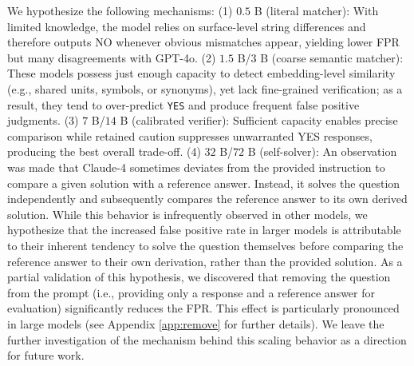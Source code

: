 We hypothesize the following mechanisms: (1) $0.5$ B (literal matcher): With limited knowledge, the model relies on surface-level string differences and therefore outputs NO whenever obvious mismatches appear, yielding lower FPR but many disagreements with GPT-4o.
(2) $1.5$ B/$3$ B (coarse semantic matcher): These models possess just enough capacity to detect embedding-level similarity (e.g., shared units, symbols, or synonyms), yet lack fine-grained verification; as a result, they tend to over-predict \texttt{YES} and produce frequent false positive judgments.
(3) $7$ B/$14$ B (calibrated verifier): Sufficient capacity enables precise comparison while retained caution suppresses unwarranted YES responses, producing the best overall trade-off.
(4) $32$ B/$72$ B (self-solver):  An observation was made that Claude-4 sometimes deviates from the provided instruction to compare a given solution with a reference answer. Instead, it solves the question independently and subsequently compares the reference answer to its own derived solution. While this behavior is infrequently observed in other models, we hypothesize that the increased false positive rate in larger models is attributable to their inherent tendency to solve the question themselves before comparing the reference answer to their own derivation, rather than the provided solution. As a partial validation of this hypothesis, we discovered that removing the question from the prompt (i.e., providing only a response and a reference answer for evaluation) significantly reduces the FPR. This effect is particularly pronounced in large models (see Appendix \ref{app:remove} for further details). We leave the further investigation of the mechanism behind this scaling behavior as a direction for future work.





